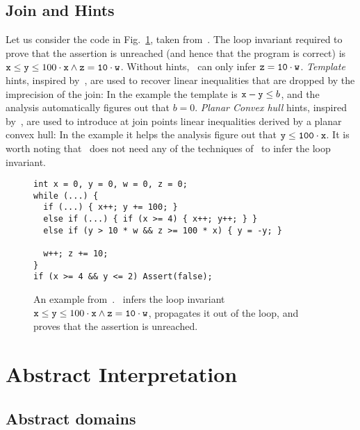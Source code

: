 \documentclass[sttt]{svjour}
\begin{document}
\subsection{Join and Hints} Let us consider the code in Fig.~\ref{fig:ex_paperSriramMS}, taken from~\cite{GulavaniEtAl08}.
The loop invariant required to prove that  the assertion  is unreached (and hence that the program is correct) is $\mathtt{x} \leq \mathtt{y} \leq 100 \cdot \mathtt{x} \wedge \mathtt{z} = \mathtt{10} \cdot \mathtt{w}$.
Without hints, \Subpoly\ can only infer  $\mathtt{z} = \mathtt{10 \cdot w}$.
\emph{Template} hints, inspired by~\cite{Sankaranarayanan05}, are used to recover linear inequalities that are dropped by the imprecision of the join: In the example the template is $\mathtt{x} - \mathtt{y} \leq b$, and the analysis automatically figures out that $b = 0$.
\emph{Planar Convex hull} hints, inspired by~\cite{SimonKing02-2}, are used to introduce at join points linear inequalities derived by a planar convex hull: In the example it helps the analysis figure out that $\mathtt{y} \leq \mathtt{100} \cdot \mathtt{x}$.
It is worth noting that \Subpoly\ does not need any of the techniques of~\cite{GulavaniEtAl08} to infer the loop invariant.

\begin{figure}%
{
\small
\begin{verbatim}
int x = 0, y = 0, w = 0, z = 0;
while (...) {
  if (...) { x++; y += 100; }
  else if (...) { if (x >= 4) { x++; y++; } }
  else if (y > 10 * w && z >= 100 * x) { y = -y; }
        
  w++; z += 10;
}
if (x >= 4 && y <= 2) Assert(false); 
\end{verbatim}
}
\caption{An example from~\cite{GulavaniEtAl08}. \Subpoly\ infers the loop invariant $\mathtt{x} \leq \mathtt{y} \leq 100 \cdot \mathtt{x} \wedge \mathtt{z} = \mathtt{10} \cdot \mathtt{w}$, propagates it out of the loop, and proves that the assertion is unreached.}
\label{fig:ex_paperSriramMS}
\end{figure}


\section{Abstract Interpretation}

\subsection{Abstract domains}
\end{document}

